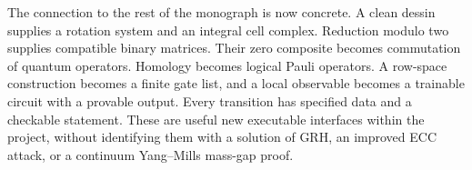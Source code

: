 The connection to the rest of the monograph is now concrete.  A clean
dessin supplies a rotation system and an integral cell complex.  Reduction
modulo two supplies compatible binary matrices.  Their zero composite
becomes commutation of quantum operators.  Homology becomes logical
Pauli operators.  A row-space construction becomes a finite gate list,
and a local observable becomes a trainable circuit with a provable output.
Every transition has specified data and a checkable statement.  These
are useful new executable interfaces within the project, without
identifying them with a solution of GRH, an improved ECC attack, or a
continuum Yang--Mills mass-gap proof.

